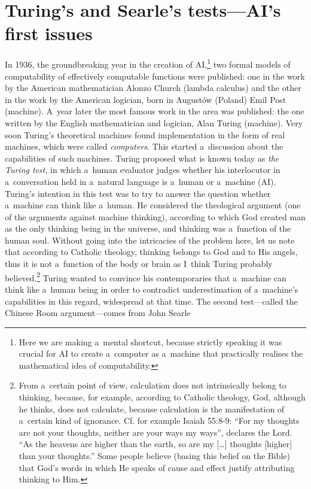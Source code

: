 \section{Turing's and Searle's tests—AI's first issues}
In 1936, the groundbreaking year in the creation of AI,\footnote{ Here we are making a~mental shortcut, because strictly speaking it was crucial for AI to create a~computer as a~machine that practically realises the mathematical idea of computability.} two formal models of computability of effectively computable functions were published: one in the work by the American mathematician Alonzo Church (lambda calculus) and the other in the work by the American logician, born in Augustów (Poland) Emil Post (machine). A~year later the most famous work in the area was published: the one written by the English mathematician and logician, Alan Turing (machine). Very soon Turing's theoretical machines found implementation in the form of real machines, which were called \textit{computers}. This started a~discussion about the capabilities of such machines. Turing
\parencite*[][]{turing_computing_1950} %
 proposed what is known today as \textit{the Turing test}, in which a~human evaluator judges whether his interlocutor in a~conversation held in a~natural language is a~human or a~machine (AI). Turing's intention in this test was to try to answer the question whether a~machine can think like a~human. He considered the theological argument (one of the arguments against machine thinking), according to which God created man as the only thinking being in the universe, and thinking was a~function of the human soul. Without going into the intricacies of the problem here, let us note that according to Catholic theology, thinking belongs to God and to His angels, thus it is not a~function of the body or brain as I~think Turing probably believed.\footnote{ From a~certain point of view, calculation does not intrinsically belong to thinking, because, for example, according to Catholic theology, God, although he thinks, does not calculate, because calculation is the manifestation of a~certain kind of ignorance. Cf. for example Isaiah 55:8-9: ``For my thoughts are not your thoughts, neither are your ways my ways'', declares the Lord. ``As the heavens are higher than the earth, so are my […] thoughts [higher] than your thoughts.'' Some people believe (basing this belief on the Bible) that God's words in which He speaks of cause and effect justify attributing thinking to Him.} Turing wanted to convince his contemporaries that a~machine can think like a~human being in order to contradict underestimation of a~machine's capabilities in this regard, widespread at that time. The second test—called the Chinese Room argument—comes from John Searle 
